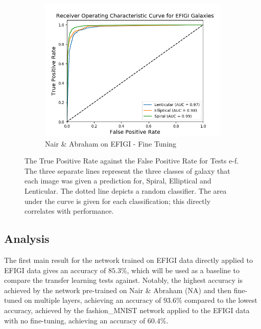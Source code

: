 \documentclass[12pt, onecolumn]{aa}
\begin{document}
\begin{figure}[t!]
\begin{center}
\begin{subfigure}[t]{0.5\linewidth}
    \includegraphics[width=\linewidth]{Figures/Results_ROC's/A_on_E_FT.png} 
    \caption{ Nair \& Abraham on EFIGI - Fine Tuning} \label{fig:A_on_e_FC}
  \end{subfigure}
  \end{center}
  \caption{The True Positive Rate against the False Positive Rate for Tests e-f. The three separate lines represent the three classes of galaxy that each image was given a prediction for, Spiral, Elliptical and Lenticular. The dotted line depicts a random classifier. The area under the curve is given for each classification; this directly correlates with performance.}
  \label{fig:roccurves2}
\end{figure}


\subsection{Analysis} \label{sec:analysis}
The first main result for the network trained on EFIGI data directly applied to EFIGI data gives an accuracy of $85.3\%$, which will be used as a baseline to compare the transfer learning tests against. Notably, the highest accuracy is achieved by the network pre-trained on Nair \& Abraham (NA) and then fine-tuned on multiple layers, achieving an accuracy of $93.6\%$ compared to the lowest accuracy, achieved by the fashion\_MNIST network applied to the EFIGI data with no fine-tuning, achieving an accuracy of $60.4\%$.\\
\end{document}
